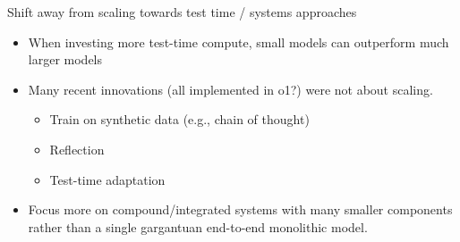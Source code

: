\begin{vbframe}{Shift away from scaling towards test time /
	systems approaches}

\vfill

\begin{itemize}
	\item When investing more test-time compute, small
	models can outperform much larger models
\item Many recent innovations (all implemented in o1?) were not about scaling.
\begin{itemize}
\item Train on synthetic data (e.g., chain of thought)
\item Reflection
\item Test-time adaptation
\end{itemize}

\item Focus more on compound/integrated systems with many
smaller components rather than a single gargantuan
end-to-end monolithic model.
\end{itemize}

\vfill

\end{vbframe}


\endlecture

